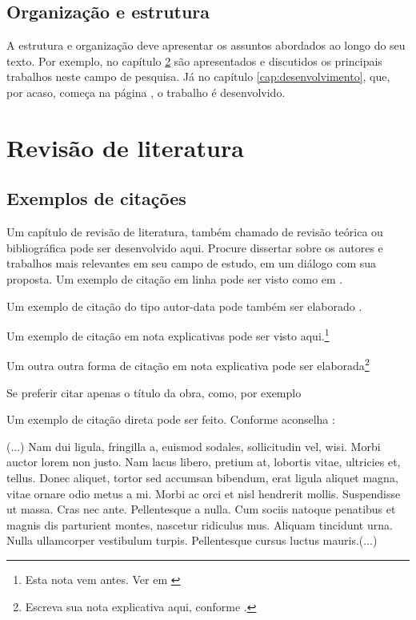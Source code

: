 \documentclass[
	12pt,				%
	openright,			%
	oneside,			%
	a4paper,			%
	english,			%
	brazil				%
	]{abntex2}
\begin{document}
\section{Organização e estrutura}

A estrutura e organização deve apresentar os assuntos abordados ao longo do seu texto. Por exemplo, no capítulo \ref{cap:revisao-de-literatura} são apresentados e discutidos os principais trabalhos neste campo de pesquisa. Já no capítulo \ref{cap:desenvolvimento}, que, por acaso, começa na página \pageref{cap:desenvolvimento}, o trabalho é desenvolvido.



\chapter{Revisão de literatura} \label{cap:revisao-de-literatura}

\section{Exemplos de citações}

Um capítulo de revisão de literatura, também chamado de revisão teórica ou bibliográfica pode ser desenvolvido aqui. Procure dissertar sobre os autores e trabalhos mais relevantes em seu campo de estudo, em um diálogo com sua proposta. Um exemplo de citação em linha pode ser visto como em \textcite{Einstein1920}. 

Um exemplo de citação do tipo autor-data pode também ser elaborado \cite{Einstein1920}. 

Um exemplo de citação em nota explicativas pode ser visto aqui.\footnote{Esta nota vem antes. Ver em \textcite[p.~22]{descartes-carta-mersene}} 

Um outra outra forma de citação em nota explicativa pode ser elaborada\footnote{Escreva sua nota explicativa aqui, conforme \cite{boyle1772}.}

Se preferir citar apenas o título da obra, como, por exemplo 

Um exemplo de citação direta pode ser feito. Conforme aconselha \textcite{boyle1772-a}:



\begin{citacao}
	(...) Nam dui ligula, fringilla a, euismod sodales, sollicitudin vel, wisi. Morbi auctor lorem non justo. Nam lacus libero, pretium at, lobortis vitae, ultricies et, tellus. Donec aliquet, tortor sed accumsan bibendum, erat ligula aliquet magna, vitae ornare odio metus a mi. Morbi ac orci et nisl hendrerit mollis. Suspendisse ut massa. Cras nec ante. Pellentesque a nulla. Cum sociis natoque penatibus et magnis dis parturient montes, nascetur ridiculus mus. Aliquam tincidunt urna. Nulla ullamcorper vestibulum turpis. Pellentesque cursus luctus mauris.(...)
\end{citacao}
\end{document}
